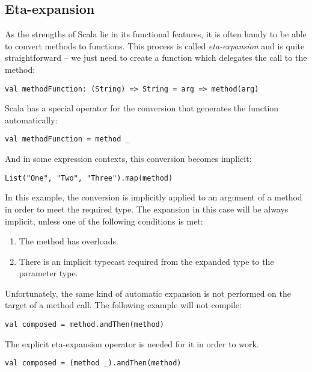 \subsection{Eta-expansion}
\label{subsec:etaexpansion}

As the strengths of Scala lie in its functional features, it is often handy to be able to convert methods to functions. This process is called \textit{eta-expansion} and is quite straightforward -- we just need to create a function which delegates the call to the method:

\lstset{style=Scala}
\begin{lstlisting}
val methodFunction: (String) => String = arg => method(arg)
\end{lstlisting}

Scala has a special operator for the conversion that generates the function automatically:

\lstset{style=Scala}
\begin{lstlisting}
val methodFunction = method _
\end{lstlisting}

And in some expression contexts, this conversion becomes implicit:

\lstset{style=Scala}
\begin{lstlisting}
List("One", "Two", "Three").map(method)
\end{lstlisting}

In this example, the conversion is implicitly applied to an argument of a method in order to meet the required type. The expansion in this case will be always implicit, unless one of the following conditions is met:
\begin{enumerate}
	\item The method has overloads.
	\item There is an implicit typecast required from the expanded type to the parameter type.
\end{enumerate}

Unfortunately, the same kind of automatic expansion is not performed on the target of a method call. The following example will not compile:

\lstset{style=Scala}
\begin{lstlisting}
val composed = method.andThen(method)
\end{lstlisting}

The explicit eta-expansion operator is needed for it in order to work.

\lstset{style=Scala}
\begin{lstlisting}
val composed = (method _).andThen(method)
\end{lstlisting}

